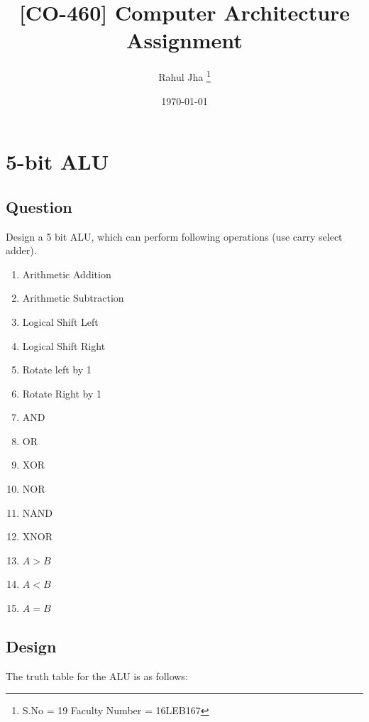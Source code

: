 \documentclass[12pt]{article}
\title{[CO-460] Computer Architecture Assignment}
\author{Rahul Jha \thanks{S.No = 19 Faculty Number = 16LEB167}}
\date{\today}
\begin{document}
\maketitle

\section{5-bit ALU}

\subsection{Question}
Design a 5 bit ALU, which can perform following operations (use carry select
adder).

\begin{multicols}{2}
  \begin{enumerate}[i]
      \item Arithmetic Addition
      \item Arithmetic Subtraction
      \item Logical Shift Left
      \item Logical Shift Right
      \item Rotate left by 1
      \item Rotate Right by 1
      \item AND
      \item OR
      \item XOR
      \item NOR
      \item NAND
      \item XNOR
      \item $ A > B $
      \item $ A < B $
      \item $ A = B $
  \end{enumerate}
\end{multicols}

\newpage

\subsection{Design}

The truth table for the ALU is as follows:
\end{document}
